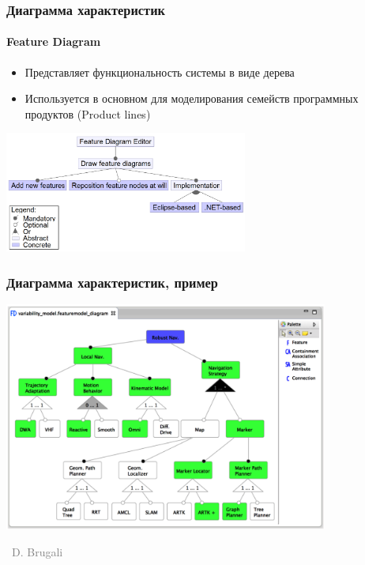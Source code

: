 \documentclass[xetex,mathserif,serif]{beamer}
\newcommand{\attribution}[1] {
    \vspace{-5mm}\begin{flushright}\begin{scriptsize}\textcolor{gray}{\textcopyright\, #1}\end{scriptsize}\end{flushright}
}
\begin{document}
    \begin{frame}
        \frametitle{Диаграмма характеристик}
        \framesubtitle{Feature Diagram}
        \begin{itemize}
            \item Представляет функциональность системы в виде дерева
            \item Используется в основном для моделирования семейств программных продуктов (Product lines)
        \end{itemize}
        \begin{center}
            \includegraphics[width=0.6\textwidth]{featureDiagram.png}
        \end{center}
    \end{frame}

    \begin{frame}
        \frametitle{Диаграмма характеристик, пример}
        \begin{center}
            \includegraphics[width=0.8\textwidth]{featureDiagramExample.png}
            \attribution{D. Brugali}
        \end{center}
    \end{frame}
\end{document}
